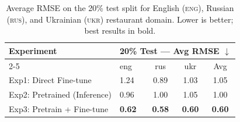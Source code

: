 
\begin{table}[h]
\centering
\small
\setlength{\tabcolsep}{4pt}
\renewcommand{\arraystretch}{1.05}
\begin{tabular}{llccc}
\toprule
\multirow{2}{*}{\textbf{Experiment}} &
\multicolumn{4}{c}{\textbf{20\% Test — Avg RMSE} $\downarrow$} \\
\cmidrule(l){2-5}
& {eng} & {rus} & {ukr} & {Avg} \\
\midrule
Exp1: Direct Fine-tune        & 1.24 & 0.89 & 1.03 & 1.05 \\
\midrule
Exp2: Pretrained (Inference)  & 0.96 & 1.00 & 1.05 & 1.00 \\
\midrule
Exp3: Pretrain + Fine-tune    & \bfseries 0.62 & \bfseries 0.58 & \bfseries 0.60 & \bfseries 0.60 \\
\bottomrule
\end{tabular}
\caption{Average RMSE on the 20\% test split for English (\textsc{eng}), Russian (\textsc{rus}), and Ukrainian (\textsc{ukr}) restaurant domain. Lower is better; best results in bold.}
\label{tab:main_results}
\end{table}